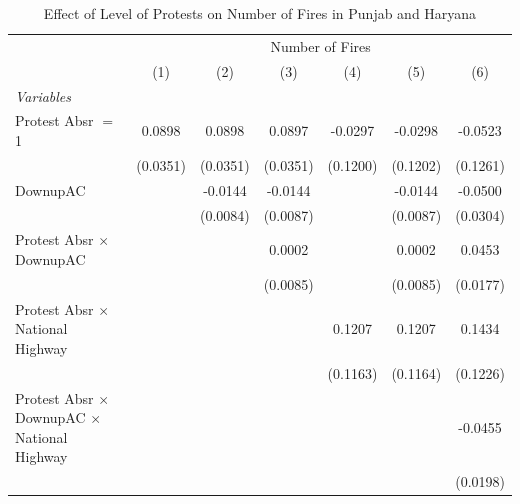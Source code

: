
\begin{table}[htbp]
   \caption{\label{tab:protest_treat_main} Effect of Level of Protests on Number of Fires in Punjab and Haryana}
   \centering
   \begin{tabular}{lcccccc}
      \tabularnewline \midrule \midrule
       & \multicolumn{6}{c}{Number of Fires}\\
                                                                 & (1)           & (2)           & (3)           & (4)           & (5)           & (6)\\  
      \midrule
      \emph{Variables}\\
      Protest Absr $=$ 1                                         & 0.0898        & 0.0898        & 0.0897        & -0.0297       & -0.0298       & -0.0523\\   
                                                                 & (0.0351)      & (0.0351)      & (0.0351)      & (0.1200)      & (0.1202)      & (0.1261)\\   
      DownupAC                                                   &               & -0.0144       & -0.0144       &               & -0.0144       & -0.0500\\   
                                                                 &               & (0.0084)      & (0.0087)      &               & (0.0087)      & (0.0304)\\   
      Protest Absr $\times$ DownupAC                             &               &               & 0.0002        &               & 0.0002        & 0.0453\\   
                                                                 &               &               & (0.0085)      &               & (0.0085)      & (0.0177)\\   
      Protest Absr $\times$ National Highway                     &               &               &               & 0.1207        & 0.1207        & 0.1434\\   
                                                                 &               &               &               & (0.1163)      & (0.1164)      & (0.1226)\\   
      Protest Absr $\times$ DownupAC $\times$ National Highway   &               &               &               &               &               & -0.0455\\   
                                                                 &               &               &               &               &               & (0.0198)\\   

\end{tabular}
\end{table}
